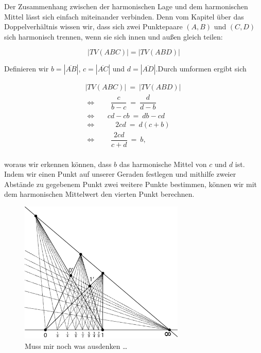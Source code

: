 \documentclass[12pt,a4paper]{article}
\begin{document}
Der Zusammenhang zwischen der harmonischen Lage und dem harmonischen Mittel lässt sich einfach miteinander verbinden. Denn vom Kapitel über das Doppelverhältnis wissen wir, dass sich zwei Punktepaare $(A, B)$ und $(C, D)$ sich harmonisch trennen, wenn sie sich innen und außen gleich teilen:

\[|TV(A B C)| = |TV(A B D)|\]

Definieren wir $b = |\overline{A B}|$, $c = |\overline{A C}|$ und $d = |\overline{A D}|$.Durch umformen ergibt sich

\begin{equation*}
\begin{split}
|TV(A B C)|~=~|TV(A B D)| ~\\
\Longleftrightarrow ~~~~~~~~~\dfrac{c}{b-c}~=~\dfrac{d}{d-b}~~~~~~~~~~\\
\Longleftrightarrow ~~~~~~~cd-cb~=~db-cd~~~~~~~~\\
\Longleftrightarrow ~~~~~~~~~~~~2 cd~=~d (c+b)~~~~~~~\\
\Longleftrightarrow ~~~~~~~~~\dfrac{2cd}{c+d}~=~b,~~~~~~~~~~~~~~~\\
\end{split}
\end{equation*}

woraus wir erkennen können, dass $b$ das harmonische Mittel von $c$ und $d$ ist. Indem wir einen Punkt auf unserer Geraden festlegen und mithilfe zweier Abstände zu gegebenem Punkt zwei weitere Punkte bestimmen, können wir mit dem harmonischen Mittelwert den vierten Punkt berechnen.

\begin{figure}[htbp] 
\centering
\includegraphics[width=0.7\textwidth]{Bilder/harmMittel.png}
\caption{Muss mir noch was ausdenken \dots}
\label{fig:harmMittel}
\end{figure}
\end{document}
